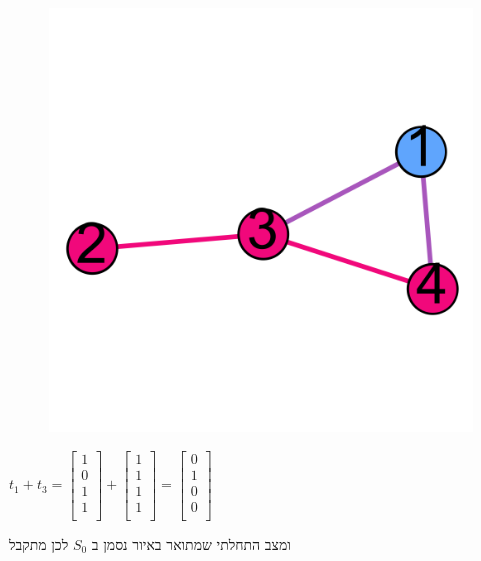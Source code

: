 \documentclass[12pt,twoside]{article}
\begin{document}
\begin{figure}[ht]
    \caption{}
    \label{fig:start graph presses}
    \unsethebrew
    \centering
    \includegraphics[width=.7\textwidth,height=.7\textheight,keepaspectratio]{images/graph_presses.png}
\end{figure}
\sethebrew

$
    t_1 + t_3 = 
    \begin{bmatrix}
        1 \\
        0 \\
        1 \\
        1 \\
    \end{bmatrix}
    +
    \begin{bmatrix}
        1 \\
        1 \\
        1 \\
        1 \\
    \end{bmatrix}
    =
    \begin{bmatrix}
        0 \\
        1 \\
        0 \\
        0 \\
    \end{bmatrix}
$

ומצב התחלתי שמתואר באיור נסמן ב
$S_0$
לכן מתקבל
\end{document}
